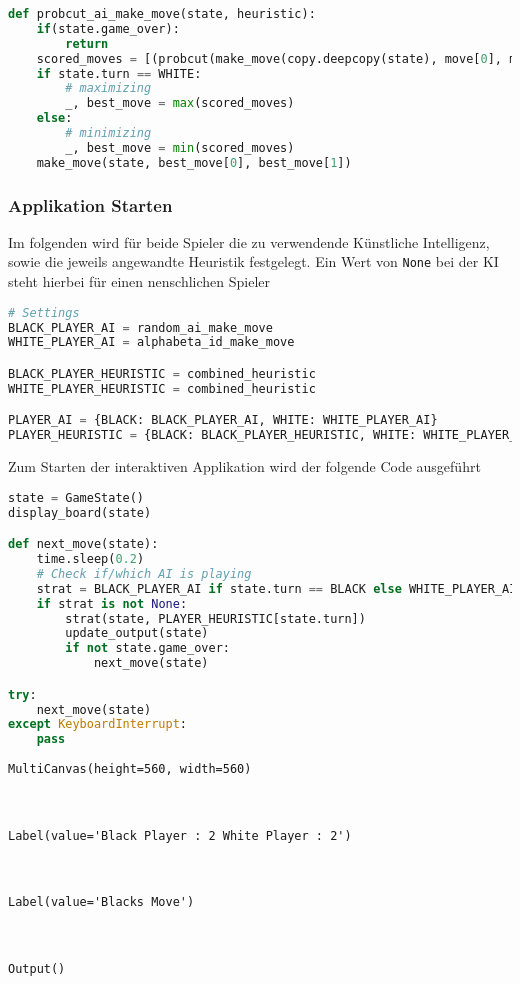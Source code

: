 \begin{lstlisting}[language=Python]
def probcut_ai_make_move(state, heuristic):
    if(state.game_over):
        return
    scored_moves = [(probcut(make_move(copy.deepcopy(state), move[0], move[1]), PROBCUT_DEPTH-1, -1, 1, heuristic), move) for move in state.possible_moves]
    if state.turn == WHITE:
        # maximizing
        _, best_move = max(scored_moves)
    else:
        # minimizing
        _, best_move = min(scored_moves)
    make_move(state, best_move[0], best_move[1])
\end{lstlisting}

\hypertarget{applikation-starten}{%
\subsubsection{Applikation Starten}\label{applikation-starten}}

Im folgenden wird für beide Spieler die zu verwendende Künstliche
Intelligenz, sowie die jeweils angewandte Heuristik festgelegt. Ein Wert
von \passthrough{\lstinline!None!} bei der KI steht hierbei für einen
nenschlichen Spieler

\begin{lstlisting}[language=Python]
# Settings
BLACK_PLAYER_AI = random_ai_make_move
WHITE_PLAYER_AI = alphabeta_id_make_move

BLACK_PLAYER_HEURISTIC = combined_heuristic
WHITE_PLAYER_HEURISTIC = combined_heuristic

PLAYER_AI = {BLACK: BLACK_PLAYER_AI, WHITE: WHITE_PLAYER_AI}
PLAYER_HEURISTIC = {BLACK: BLACK_PLAYER_HEURISTIC, WHITE: WHITE_PLAYER_HEURISTIC}
\end{lstlisting}

Zum Starten der interaktiven Applikation wird der folgende Code
ausgeführt

\begin{lstlisting}[language=Python]
state = GameState()
display_board(state)

def next_move(state):
    time.sleep(0.2)
    # Check if/which AI is playing
    strat = BLACK_PLAYER_AI if state.turn == BLACK else WHITE_PLAYER_AI
    if strat is not None:
        strat(state, PLAYER_HEURISTIC[state.turn])
        update_output(state)
        if not state.game_over:
            next_move(state)

try:
    next_move(state)
except KeyboardInterrupt:
    pass
\end{lstlisting}

\begin{lstlisting}
MultiCanvas(height=560, width=560)



Label(value='Black Player : 2 White Player : 2')



Label(value='Blacks Move')



Output()
\end{lstlisting}

